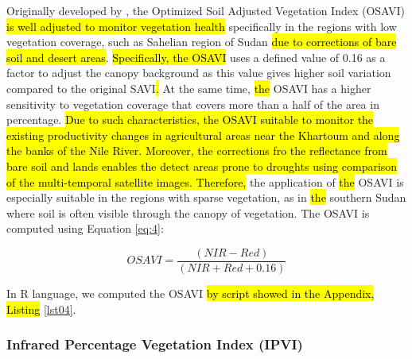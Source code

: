 \documentclass[jimaging,article,submit,pdftex,moreauthors]{Definitions/mdpi}
\begin{document}
Originally developed by \cite{Rondeaux}, the Optimized Soil Adjusted Vegetation Index (OSAVI) \hl{is well adjusted to monitor vegetation health }specifically in the regions with low vegetation coverage, such as Sahelian region of Sudan \hl{due to corrections of bare soil and desert areas}. \hl{Specifically, the OSAVI }uses a defined value of 0.16 as a factor to adjust the canopy background as this value gives higher soil variation compared to the original SAVI\hl{. }At the same time, \hl{the }OSAVI has a higher sensitivity to vegetation coverage that covers more than a half of the area in percentage. \hl{Due to such characteristics, the OSAVI suitable to monitor the existing productivity changes in agricultural areas near the Khartoum and along the banks of the Nile River. Moreover, the corrections fro the reflectance from bare soil and lands enables the detect areas prone to droughts using comparison of the multi-temporal satellite images. Therefore, }the application\hl{ }of \hl{the }OSAVI is especially suitable in the regions with sparse vegetation, as in \hl{the }southern Sudan where soil is often visible through the canopy of vegetation. The OSAVI is computed using Equation \ref{eq:4}:

\begin{equation}\label{eq:4}
	OSAVI=\dfrac{(NIR-Red)}{(NIR+Red+0.16)}
\end{equation}

In R language, we computed the OSAVI \hl{by script showed in the Appendix, Listing }\ref{lst04}.

\subsubsection{Infrared Percentage Vegetation Index (IPVI)}
\end{document}
